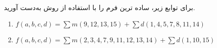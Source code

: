 برای توابع زیر، ساده ترین فرم  را با استفاده از روش  به‌دست آورید.

\begin{latin}
	\begin{enumerate}
		\item %
		$f(a,b,c,d)=\sum m(9,12,13,15) + \sum d(1,4,5,7,8,11,14)$
		
		\item %
		$f(a,b,c,d)=\sum m(2,3,4,7,9,11,12,13,14) + \sum d(1,10,15)$
	\end{enumerate} 
\end{latin}	

